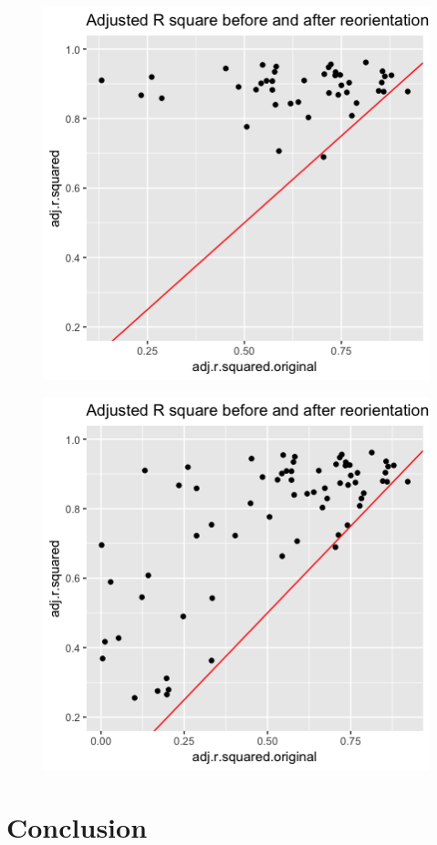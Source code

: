 \documentclass[10pt,letterpaper]{article}
\begin{document}
\begin{figure}[H]
\includegraphics[width=0.8\linewidth]{visualization_paper/adj_r2_before_after_wt} \end{figure}

\begin{figure}[H]
\includegraphics[width=0.8\linewidth]{visualization_paper/adj_r2_before_after_yt} \end{figure}

\hypertarget{conclusion}{%
\section*{Conclusion}\label{conclusion}}
\end{document}
